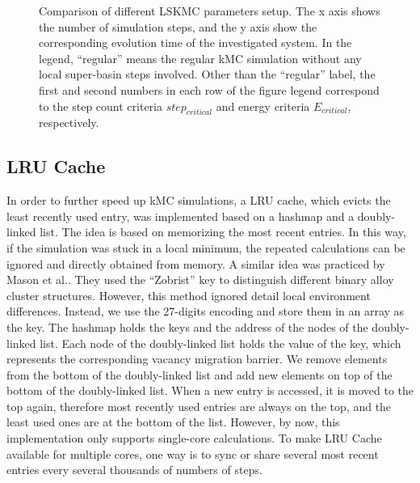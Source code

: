 \begingroup
\begin{figure}[!ht]
  \centering
\caption[Comparison of different \ac{LSKMC} parameters setup.]{Comparison of different \ac{LSKMC} parameters setup. The x axis shows the number of simulation steps, and the y axis show the corresponding evolution time of the investigated system. In the legend, ``regular'' means the regular \ac{kMC} simulation without any local super-basin steps involved. Other than the ``regular'' label, the first and second numbers in each row of the figure legend correspond to the step count criteria $step_{critical}$ and energy criteria $E_{critical}$, respectively.}
\label{Chap:Al/Vac:fig:lskmc_time}
\end{figure}
\endgroup


\subsection{\acf{LRU} Cache}
\label{Chap:Al/Vac:sec:LRU}
In order to further speed up \ac{kMC} simulations, a \acf{LRU} cache, which evicts the least recently used entry, was implemented based on a hashmap and a  doubly-linked list. The idea is based on memorizing the most recent entries. In this way, if the simulation was stuck in a local minimum, the repeated calculations can be ignored and directly obtained from memory. A similar idea was practiced by Mason et al.\cite{mason2005fast}. They used the ``Zobrist'' key to distinguish different binary alloy cluster structures. However, this method ignored detail local environment differences. Instead, we use the 27-digits encoding and store them in an array as the key. The hashmap holds the keys and the address of the nodes of the doubly-linked list. Each node of the doubly-linked list holds the value of the key, which represents the corresponding vacancy migration barrier. We remove elements from the bottom of the doubly-linked list and add new elements on top of the bottom of the doubly-linked list. When a new entry is accessed, it is moved to the top again, therefore most recently used entries are always on the top, and the least used ones are at the bottom of the list. However, by now, this implementation only supports single-core calculations. To make \ac{LRU} Cache available for multiple cores, one way is to sync or share several most recent entries every several thousands of numbers of steps.

